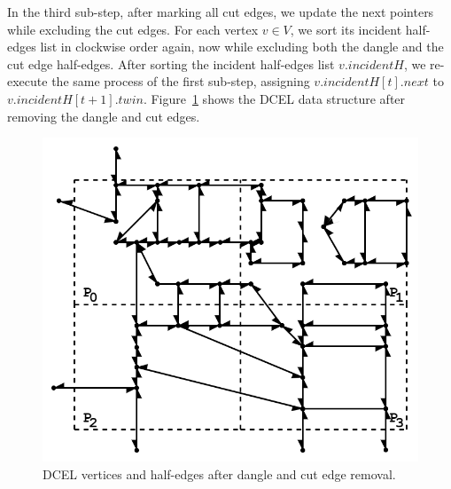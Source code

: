 In the third sub-step, after marking all cut edges, we update the next pointers while excluding the cut edges. 
For each vertex $v \in V$, we sort its incident half-edges list in clockwise order again, now while excluding both the dangle and the cut edge half-edges.
After sorting the incident half-edges list $v.incidentH$, we re-execute the same process of the first sub-step, assigning $v.incidentH[t].next$ to $v.incidentH[t+1].twin$. 
Figure~\ref{fig:ddcel:step2} shows the DCEL data structure after removing the dangle and cut edges.


\begin{figure}[tb]
	\centering
	\includegraphics[width=0.75 \linewidth ]{chapter2/model/ddcel-2.png}
	\caption{DCEL vertices and half-edges after dangle and cut edge removal.}
	\label{fig:ddcel:step2}
\end{figure}


